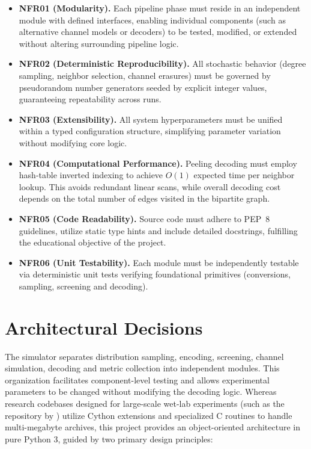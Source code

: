 \begin{itemize}
    \item \textbf{NFR01 (Modularity).} Each pipeline phase must reside in an independent module with defined interfaces, enabling individual components (such as alternative channel models or decoders) to be tested, modified, or extended without altering surrounding pipeline logic.

    \item \textbf{NFR02 (Deterministic Reproducibility).} All stochastic behavior (degree sampling, neighbor selection, channel erasures) must be governed by pseudorandom number generators seeded by explicit integer values, guaranteeing repeatability across runs.

    \item \textbf{NFR03 (Extensibility).} All system hyperparameters must be unified within a typed configuration structure, simplifying parameter variation without modifying core logic.

    \item \textbf{NFR04 (Computational Performance).} Peeling decoding must employ hash-table inverted indexing to achieve $O(1)$ expected time per neighbor lookup. This avoids redundant linear scans, while overall decoding cost depends on the total number of edges visited in the bipartite graph.

    \item \textbf{NFR05 (Code Readability).} Source code must adhere to PEP~8 guidelines, utilize static type hints and include detailed docstrings, fulfilling the educational objective of the project.

    \item \textbf{NFR06 (Unit Testability).} Each module must be independently testable via deterministic unit tests verifying foundational primitives (conversions, sampling, screening and decoding).
\end{itemize}

\section{Architectural Decisions}
\label{sec:architectural_decisions}

The simulator separates distribution sampling, encoding, screening, channel simulation, decoding and metric collection into independent modules. This organization facilitates component-level testing and allows experimental parameters to be changed without modifying the decoding logic. Whereas research codebases designed for large-scale wet-lab experiments (such as the repository by ) utilize Cython extensions and specialized C routines to handle multi-megabyte archives, this project provides an object-oriented architecture in pure Python 3, guided by two primary design principles:


